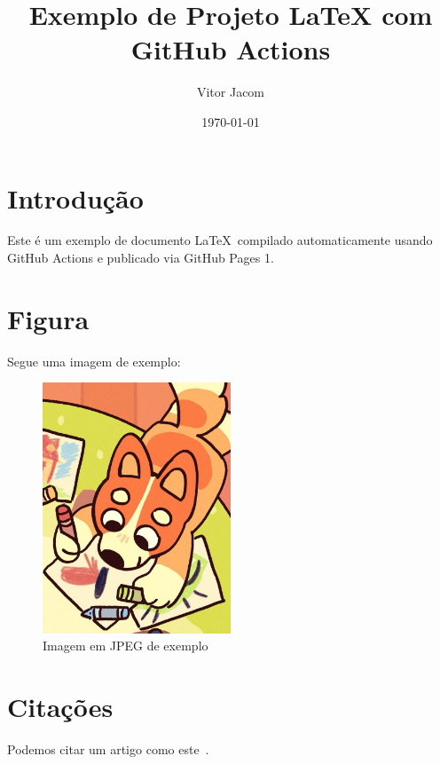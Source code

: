 \documentclass[12pt]{article}
\title{Exemplo de Projeto LaTeX com GitHub Actions}
\author{Vitor Jacom}
\date{\today}
\begin{document}
\maketitle

\section{Introdução}
Este é um exemplo de documento \LaTeX~compilado automaticamente usando GitHub Actions e publicado via GitHub Pages 1.

\section{Figura}
Segue uma imagem de exemplo:

\begin{figure}[h!]
\centering
\includegraphics[width=0.5\textwidth]{figures/default.jpg}
\caption{Imagem em JPEG de exemplo}
\end{figure}

\section{Citações}
Podemos citar um artigo como este~\cite{knuth1984texbook}.

\printbibliography
\end{document}
